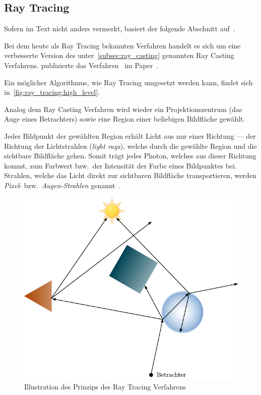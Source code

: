 
\subsection{Ray Tracing}
\label{subsec:ray_tracing}

Sofern im Text nicht anders vermerkt, basiert der folgende Abschnitt
auf~\cite[S. 1 bis 77]{glassner_introduction_1989}.

Bei dem heute als Ray Tracing bekannten Verfahren handelt es sich um
eine verbesserte Version des unter~\ref{subsec:ray_casting} genannten
Ray Casting Verfahrens. \citeauthor{whitted_improved_1980} publizierte
das Verfahren~\citeyear{whitted_improved_1980} im
Paper~.

Ein möglicher Algorithmus, wie Ray Tracing umgesetzt werden kann, findet
sich in~\autoref{fig:ray_tracing:high_level}.

Analog dem Ray Casting Verfahren wird wieder ein Projektionszentrum (das
Auge eines Betrachters) sowie eine Region einer beliebigen Bildfläche
gewählt.

Jeder Bildpunkt der gewählten Region erhält Licht aus nur einer Richtung
--- der Richtung der Lichtstrahlen (\textit{light rays}), welche durch
die gewählte Region und die sichtbare Bildfläche gehen. Somit trägt
jedes Photon, welches aus dieser Richtung kommt, zum Farbwert bzw.\ der
Intensität der Farbe eines Bildpunktes bei. Strahlen, welche das Licht
direkt zur sichtbaren Bildfläche transportieren, werden \textit{Pixel}-
bzw.\ \textit{Augen-Strahlen} genannt~\parencite[S.
10]{glassner_introduction_1989}.

\begin{figure}[H]
    \centering
    \includegraphics{img/ray_tracing_scene.pdf}
    \caption{Illustration des Prinzips des Ray Tracing
        Verfahrens\protect\footnotemark}\label{fig:ray_tracing_scene}
\end{figure}

